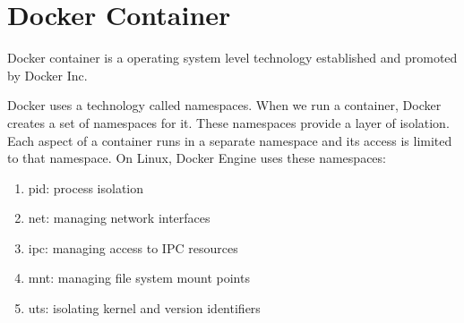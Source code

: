 \section{Docker Container}
Docker container is a operating system level technology established  and promoted by Docker Inc.

Docker uses a technology called namespaces. When we run a container, Docker creates a set of namespaces for it. These namespaces provide a layer of isolation. Each aspect of a container runs in a separate namespace and its access is limited to that namespace.
On Linux, Docker Engine uses these namespaces:
\begin{enumerate}
\item pid: process isolation
\item net: managing network interfaces
\item ipc: managing access to IPC resources
\item mnt: managing file system mount points
\item uts: isolating kernel and version identifiers
\end{enumerate}

